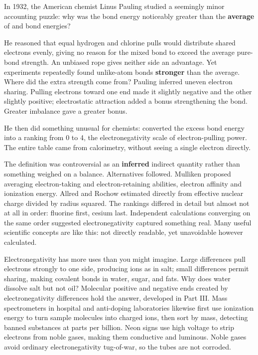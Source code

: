 \begin{zhengju}
In 1932, the American chemist Linus Pauling studied a seemingly minor accounting puzzle: why was the  bond energy noticeably greater than the \textbf{average} of  and  bond energies?

He reasoned that equal hydrogen and chlorine pulls would distribute shared electrons evenly, giving no reason for the mixed bond to exceed the average pure-bond strength. An unbiased rope gives neither side an advantage. Yet experiments repeatedly found unlike-atom bonds \textbf{stronger} than the average. Where did the extra strength come from? Pauling inferred uneven electron sharing. Pulling electrons toward one end made it slightly negative and the other slightly positive; electrostatic attraction added a bonus strengthening the bond. Greater imbalance gave a greater bonus.

He then did something unusual for chemists: converted the excess bond energy into a ranking from 0 to 4, the electronegativity scale of electron-pulling power. The entire table came from calorimetry, without seeing a single electron directly.

The definition was controversial as an \textbf{inferred} indirect quantity rather than something weighed on a balance. Alternatives followed. Mulliken proposed averaging electron-taking and electron-retaining abilities, electron affinity and ionization energy. Allred and Rochow estimated directly from effective nuclear charge divided by radius squared. The rankings differed in detail but almost not at all in order: fluorine first, cesium last. Independent calculations converging on the same order suggested electronegativity captured something real. Many useful scientific concepts are like this: not directly readable, yet unavoidable however calculated.
\end{zhengju}

Electronegativity has more uses than you might imagine. Large differences pull electrons strongly to one side, producing ions as in salt; small differences permit sharing, making covalent bonds in water, sugar, and fats. Why does water dissolve salt but not oil? Molecular positive and negative ends created by electronegativity differences hold the answer, developed in Part III. Mass spectrometers in hospital and anti-doping laboratories likewise first use ionization energy to turn sample molecules into charged ions, then sort by mass, detecting banned substances at parts per billion. Neon signs use high voltage to strip electrons from noble gases, making them conductive and luminous. Noble gases avoid ordinary electronegativity tug-of-war, so the tubes are not corroded.

